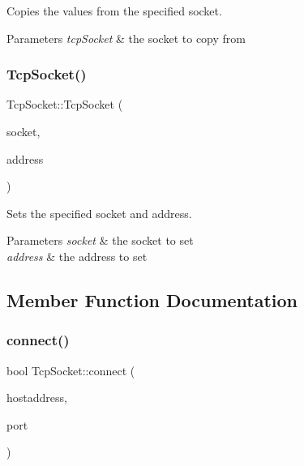 Copies the values from the specified socket. 


\begin{DoxyParams}{Parameters}
{\em tcp\+Socket} & the socket to copy from \\
\hline
\end{DoxyParams}
\mbox{\label{class_tcp_socket_adc173be5af51b5ead7ef1f370453c2d2}} 
\subsubsection{\texorpdfstring{TcpSocket()}{TcpSocket()}\hspace{0.1cm}{\footnotesize\ttfamily [2/2]}}
{\footnotesize\ttfamily Tcp\+Socket\+::\+Tcp\+Socket (\begin{DoxyParamCaption}\item[{S\+O\+C\+K\+ET \&}]{socket,  }\item[{S\+O\+C\+K\+A\+D\+D\+R\+\_\+\+IN \&}]{address }\end{DoxyParamCaption})}



Sets the specified socket and address. 


\begin{DoxyParams}{Parameters}
{\em socket} & the socket to set \\
\hline
{\em address} & the address to set \\
\hline
\end{DoxyParams}


\subsection{Member Function Documentation}
\mbox{\label{class_tcp_socket_a396dcc6c060e02611574c18474deedfc}} 
\subsubsection{\texorpdfstring{connect()}{connect()}}
{\footnotesize\ttfamily bool Tcp\+Socket\+::connect (\begin{DoxyParamCaption}\item[{const A\+String \&}]{hostaddress,  }\item[{ushort}]{port }\end{DoxyParamCaption})\hspace{0.3cm}{\ttfamily [virtual]}}



